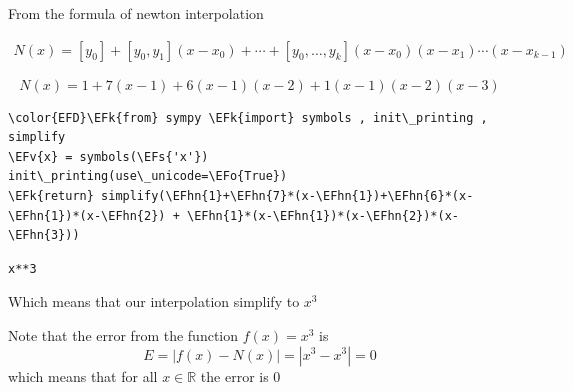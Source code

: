 \documentclass[11pt]{article}
\newcommand{\EFs}[1]{\textcolor{EFs}{#1}} %
\newcommand{\EFk}[1]{\textcolor{EFk}{#1}} %
\newcommand{\EFv}[1]{\textcolor{EFv}{#1}} %
\newcommand{\EFo}[1]{\textcolor{EFo}{#1}} %
\newcommand{\EFhn}[1]{\textcolor{EFhn}{#1}} %
\begin{document}
From the formula of newton interpolation

\begin{align}
N(x) = [y_0] + [y_0,y_1](x-x_0) + \cdots + [y_0,\ldots,y_k](x-x_0)(x-x_1)\cdots(x-x_{k-1})
\end{align}


\begin{equation}
N(x) = 1+7(x-1)+6(x-1)(x-2) + 1(x-1)(x-2)(x-3)
\end{equation}


\begin{Code}
\begin{Verbatim}
\color{EFD}\EFk{from} sympy \EFk{import} symbols , init\_printing , simplify
\EFv{x} = symbols(\EFs{'x'})
init\_printing(use\_unicode=\EFo{True})
\EFk{return} simplify(\EFhn{1}+\EFhn{7}*(x-\EFhn{1})+\EFhn{6}*(x-\EFhn{1})*(x-\EFhn{2}) + \EFhn{1}*(x-\EFhn{1})*(x-\EFhn{2})*(x-\EFhn{3}))
\end{Verbatim}
\end{Code}

\begin{verbatim}
x**3
\end{verbatim}



Which means that our interpolation simplify to \(x^3\)


Note that the error from the function \(f(x)  = x^3\) is
\[ E = |f(x) - N(x)| = |x^3- x^3| = 0  \]
which means that for all \(x \in \mathbb{R}\)  the error is 0
\end{document}

